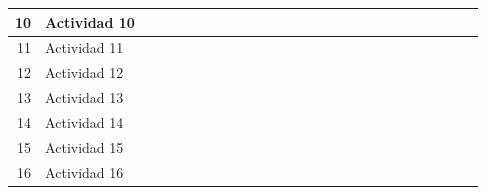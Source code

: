 \documentclass[10pt,letterpaper]{report}
\begin{document}
\begin{landscape}
\begin{table}[htbp]
{\begin{tabular}{|r|l|r|r|r|r|r|r|r|r|r|r|r|r|r|r|r|r|r|r|r|r|r|r|r|r|}
            \midrule
            10    & Actividad 10 &       &       &       &       &       & \cellcolor[rgb]{ .557,  .663,  .859} & \cellcolor[rgb]{ .557,  .663,  .859} & \cellcolor[rgb]{ .557,  .663,  .859} & \cellcolor[rgb]{ .557,  .663,  .859} &       &       &       &       &       &       &       &       &       &       &       &       &       &       &  \\
            \midrule
            11    & Actividad 11 &       &       &       &       &       &       &       &       &       &       & \cellcolor[rgb]{ .557,  .663,  .859} & \cellcolor[rgb]{ .557,  .663,  .859} & \cellcolor[rgb]{ .557,  .663,  .859} & \cellcolor[rgb]{ .557,  .663,  .859} &       &       &       &       &       &       &       &       &       &  \\
            \midrule
            12    & Actividad 12 &       &       &       &       &       &       &       &       &       &       &       &       &       &       &       &       &       &       &       &       &       &       &       &  \\
            \midrule
            13    & Actividad 13 &       &       &       &       &       &       &       &       &       &       &       &       &       &       & \cellcolor[rgb]{ .557,  .663,  .859} & \cellcolor[rgb]{ .557,  .663,  .859} & \cellcolor[rgb]{ .557,  .663,  .859} & \cellcolor[rgb]{ .557,  .663,  .859} & \cellcolor[rgb]{ .557,  .663,  .859} &       &       &       &       &  \\
            \midrule
            14    & Actividad 14 &       &       &       &       &       &       &       &       &       &       &       &       &       &       &       &       &       &       &       & \cellcolor[rgb]{ .557,  .663,  .859} & \cellcolor[rgb]{ .557,  .663,  .859} & \cellcolor[rgb]{ .557,  .663,  .859} & \cellcolor[rgb]{ .557,  .663,  .859} &  \\
            \midrule
            15    & Actividad 15 &       &       &       &       &       &       &       &       &       &       &       &       &       &       &       &       &       &       &       &       &       & \cellcolor[rgb]{ .557,  .663,  .859} & \cellcolor[rgb]{ .557,  .663,  .859} & \cellcolor[rgb]{ .557,  .663,  .859} \\
            \midrule
            16    & Actividad 16 &       &       &       &       &       &       &       &       &       &       &       &       &       &       &       &       &       &       &       &       &       & \cellcolor[rgb]{ .557,  .663,  .859} & \cellcolor[rgb]{ .557,  .663,  .859} & \cellcolor[rgb]{ .557,  .663,  .859} \\
            \bottomrule
    \end{tabular}}%
    \label{tab:tab3}%
\end{table}%

\end{landscape}
\end{document}

